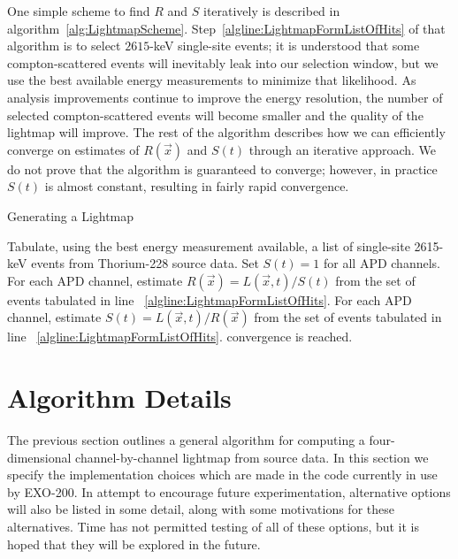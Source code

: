 One simple scheme to find $R$ and $S$ iteratively is described in algorithm~\ref{alg:LightmapScheme}.  Step~\ref{algline:LightmapFormListOfHits} of that algorithm is to select $2615$-keV single-site events; it is understood that some compton-scattered events will inevitably leak into our selection window, but we use the best available energy measurements to minimize that likelihood. As analysis improvements continue to improve the energy resolution, the number of selected compton-scattered events will become smaller and the quality of the lightmap will improve.  The rest of the algorithm describes how we can efficiently converge on estimates of $R(\vec{x})$ and $S(t)$ through an iterative approach.  We do not prove that the algorithm is guaranteed to converge; however, in practice $S(t)$ is almost constant, resulting in fairly rapid convergence.

\begin{algorithm}
\caption{Generating a Lightmap}
\label{alg:LightmapScheme}
\begin{algorithmic}[1]
\STATE Tabulate, using the best energy measurement available, a list of single-site 2615-keV events from Thorium-228 source data. \label{algline:LightmapFormListOfHits}
\STATE Set $S(t) = 1$ for all APD channels.
\REPEAT
  \STATE For each APD channel, estimate $R(\vec{x}) = L(\vec{x},t)/S(t)$ from the set of events tabulated in line ~\ref{algline:LightmapFormListOfHits}.
  \STATE For each APD channel, estimate $S(t) = L(\vec{x},t)/R(\vec{x})$ from the set of events tabulated in line ~\ref{algline:LightmapFormListOfHits}.
\UNTIL convergence is reached.
\end{algorithmic}
\end{algorithm}


\section{Algorithm Details}

The previous section outlines a general algorithm for computing a four-dimensional channel-by-channel lightmap from source data.  In this section we specify the implementation choices which are made in the code currently in use by EXO-200.  In attempt to encourage future experimentation, alternative options will also be listed in some detail, along with some motivations for these alternatives.  Time has not permitted testing of all of these options, but it is hoped that they will be explored in the future.

